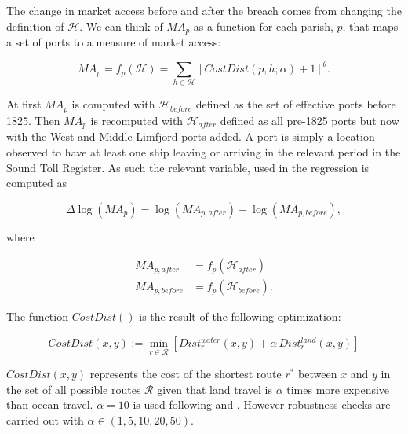 The change in market access before and after the breach comes from changing the definition of $\mathscr{H}$. We can think of $\textit{MA}_p$ as a function for each parish, $p$, that maps a set of ports to a measure of market access:

\begin{equation}
\label{eq:MA99}
\textit{MA}_p = f_p(\mathscr{H}) = \sum_{h \in \mathscr{H}} [CostDist(p, h; \alpha) + 1]^\theta.
\end{equation}

At first $\textit{MA}_p$ is computed with $\mathscr{H}_{\textit{before}}$ defined as the set of effective ports before 1825. Then $\textit{MA}_p$ is recomputed with $\mathscr{H}_{\textit{after}}$ defined as all pre-1825 ports but now with the West and Middle Limfjord ports added. A port is simply a location observed to have at least one ship leaving or arriving in the relevant period in the Sound Toll Register. As such the relevant variable, used in the regression is computed as

\begin{equation}
\label{eq:MA100}
\Delta \log(\textit{MA}_p) = \log(\textit{MA}_{p,\textit{after}}) - \log(\textit{MA}_{p,\textit{before}}),
\end{equation}

\noindent
where

\begin{equation}
\begin{split}
\label{eq:MA101}
\textit{MA}_{p,\textit{after}} &= f_p(\mathscr{H}_{\textit{after}})\\ 
\textit{MA}_{p,\textit{before}} &= f_p(\mathscr{H}_{\textit{before}}).
\end{split}
\end{equation}

The function $CostDist()$ is the result of the following optimization:

\begin{equation}
\label{eq:MA4}
CostDist(x, y):=\min_{r\in \mathscr{R}}\left[Dist^{water}_r(x, y) + \alpha\, Dist^{land}_r(x, y)\right]
\end{equation}

$CostDist(x,y)$ represents the cost of the shortest route $r^*$ between $x$ and $y$ in the set of all possible routes $\mathscr{R}$ given that land travel is $\alpha$ times more expensive than ocean travel. $\alpha = 10$ is used following \cite{Marczinek2022} and \cite{rauch2022a}. However robustness checks are carried out with $\alpha \in (1, 5, 10, 20, 50)$. 

